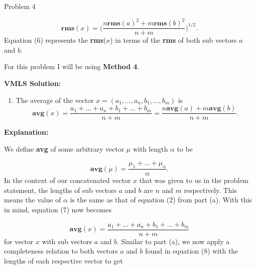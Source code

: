 \begin{problem}{Problem 4}
\begin{highlight}
        \begin{equation}
            \mathbf{rms}(x) = \Bigg(\frac{n\mathbf{rms}(a)^{2} + m\mathbf{rms}(b)^{2}}{n+m} \Bigg)^{1/2}.
        \end{equation}
        Equation (6) represents the \textbf{rms}($x$) in terms of the \textbf{rms} of both sub vectors $a$ and $b$.
    \end{highlight}

    \begin{highlight}
        For this problem I will be using \textbf{Method 4}. \vspace*{1em}

        \textbf{VMLS Solution:}

        \begin{enumerate}[label=(\alph*), start=2]
            \item The average of the vector $x = (a_{1}, \dots, a_{n}, b_{1}, \dots, b_{m})$ is
            \begin{equation*}
                \mathbf{avg}(x) = \frac{a_{1} + \dots + a_{n} + b_{1} + \dots + b_{m}}{n + m} = \frac{n\mathbf{avg}(a) + m\mathbf{avg}(b)}{n + m}.
            \end{equation*}
        \end{enumerate}

        \textbf{Explanation:} \vspace*{1em}

        We define \textbf{avg} of some arbitrary vector $\mu$ with length $\alpha$ to be 

        \begin{equation}
            \mathbf{avg}(\mu) = \frac{\mu_{1} + \dots + \mu_{\alpha}}{\alpha}.
        \end{equation}
        In the context of our concatenated vector $x$ that was given to us in the problem statement, the lengths of sub vectors $a$ and $b$ are $n$ and $m$ respectively. This means the value of $\alpha$
        is the same as that of equation (2) from part (a). With this in mind, equation (7) now becomes 

        \begin{equation}
            \mathbf{avg}(x) = \frac{a_{1} + \dots + a_{n} + b_{1} + \dots + b_{m}}{n + m}
        \end{equation}
        for vector $x$ with sub vectors $a$ and $b$. Similar to part (a), we now apply a completeness relation to both vectors $a$ and $b$ found in equation (8) with the lengths of each respective vector
        to get


\end{highlight}
\end{problem}
